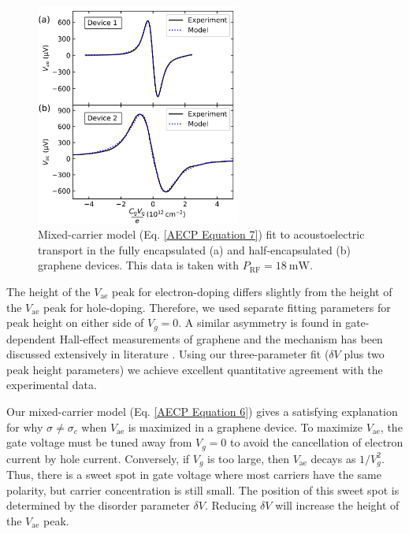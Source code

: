 \documentclass[double,12pt,1in,seploa]{beavtex}
\begin{document}
\begin{figure}
    \includegraphics[width = 0.6\textwidth]{Figure 4, Both devices Fit_corrected.png}
    \caption{Mixed-carrier model (Eq. \ref{AECP Equation 7}) fit to acoustoelectric transport in the fully encapsulated (a) and half-encapsulated (b) graphene devices. This data is taken with $P_{\mathrm{RF}} = \SI{18}{\milli\watt}$.}
    \label{AECP Figure 4}
\end{figure}

The height of the $V_{\mathrm{ae}}$ peak for electron-doping differs slightly from the height of the $V_{\mathrm{ae}}$ peak for hole-doping. Therefore, we used separate fitting parameters for peak height on either side of $V_g = 0$. A similar asymmetry is found in gate-dependent Hall-effect measurements of graphene and the mechanism has been discussed extensively in literature \cite{das_sarma_electronic_2011,thiele_modeling_2010,wehrfritz_hall_2014}. Using our three-parameter fit ($\delta V$ plus two peak height parameters) we achieve excellent quantitative agreement with the experimental data.

Our mixed-carrier model (Eq. \ref{AECP Equation 6}) gives a satisfying explanation for why $\sigma \neq \sigma_c$ when $V_{\mathrm{ae}}$ is maximized in a graphene device. To maximize $V_{\mathrm{ae}}$, the gate voltage must be tuned away from $V_g = 0$ to avoid the cancellation of electron current by hole current. Conversely, if $V_g$ is too large, then $V_{\mathrm{ae}}$ decays as $1/V_g^2$. Thus, there is a sweet spot in gate voltage where most carriers have the same polarity, but carrier concentration is still small. The position of this sweet spot is determined by the disorder parameter $\delta V$. Reducing $\delta V$ will increase the height of the $V_{\mathrm{ae}}$ peak. 
\end{document}
